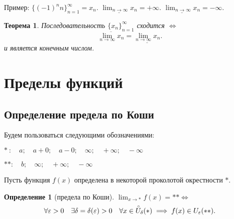\documentclass[a4paper,12pt]{article} %
\newtheorem{definition}{Определение}[subsection]
\newtheorem{theorem}{Теорема}[subsection]
\theoremstyle{remark}
\begin{document}
Пример: $\{(-1)^{n}n\}_{n=1}^{\infty} = x_n$. $\underline{\lim_{n \to \infty} x_n} = +\infty$. $\underline{\lim_{n \to \infty} x_n} = -\infty$.

\begin{theorem}
	Последовательность $\{x_n\}_{n=1}^{\infty}$ сходится $\iff$
	\[
		\overline{\lim_{n \to \infty} x_n} = \underline{\lim_{n \to \infty} x_n} 
	.\] 
	и является конечным числом.
\end{theorem}





\section{Пределы функций} 
\subsection{Определение предела по Коши}
Будем пользоваться следующими обозначениями:

$* \ : \quad a; \quad a+0; \quad a-0; \quad \infty; \quad +\infty; \quad -\infty$
 
$** : \quad b; \quad \infty; \quad +\infty; \quad -\infty$

\noindent Пусть функция $f(x)$ определена в некоторой проколотой окрестности $*$.
\begin{definition}[предела по Коши] $\lim_{x \to *} f(x) = ** \iff$
	\[
	\forall \varepsilon>0 \quad \exists \delta=\delta(\varepsilon)>0 \quad \forall x\in  \accentset{\circ}{U}_\delta(*)  \implies f(x) \in  U_\varepsilon(**)
	.\] 
\end{definition}
\end{document}
